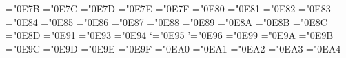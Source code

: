 \mathchardef\EmptyDownTriangle ="0E7B
\let\mEmptyDownTriangle=\EmptyDownTriangle 
\mathchardef\FilledDownTriangle ="0E7C
\let\mFilledDownTriangle=\FilledDownTriangle 
\mathchardef\FilledLeftTriangle ="0E7D
\let\mFilledLeftTriangle=\FilledLeftTriangle 
\mathchardef\star ="0E7E
\let\mFivePointedStar=\star 
\mathchardef\SixPointedStar ="0E7F
\let\mSixPointedStar=\SixPointedStar 
\mathchardef\GraySquare ="0E80
\let\mGraySquare=\GraySquare 
\mathchardef\GrayCircle ="0E81
\let\mGrayCircle=\GrayCircle 
\mathchardef\WatchIcon ="0E82
\let\mWatchIcon=\WatchIcon 
\mathchardef\KernelIcon ="0E83
\let\mKernelIcon=\KernelIcon 
\mathchardef\MathematicaIcon ="0E84
\let\mMathematicaIcon=\MathematicaIcon 
\mathchardef\flat ="0E85
\let\mFlat=\flat 
\mathchardef\natural ="0E86
\let\mNatural=\natural 
\mathchardef\sharp ="0E87
\let\mSharp=\sharp 
\mathchardef\spadesuit ="0E88
\let\mSpadeSuit=\spadesuit 
\mathchardef\heartsuit ="0E89
\let\mHeartSuit=\heartsuit 
\mathchardef\diamondsuit ="0E8A
\let\mDiamondSuit=\diamondsuit 
\mathchardef\clubsuit ="0E8B
\let\mClubSuit=\clubsuit 
\mathchardef\InvisibleSpace ="0E8C
\let\mInvisibleSpace=\InvisibleSpace 
\mathchardef\VeryThinSpace ="0E8D
\let\mVeryThinSpace=\VeryThinSpace 
\def\mThinSpace{\@unicode{ThinSpace}}
\def\mMediumSpace{\@unicode{MediumSpace}}
\def\mThickSpace{\@unicode{ThickSpace}}
\mathchardef\NegativeVeryThinSpace ="0E91
\let\mNegativeVeryThinSpace=\NegativeVeryThinSpace 
\def\mNegativeThinSpace{\@unicode{NegativeThinSpace}}
\mathchardef\negmedspace ="0E93
\let\mNegativeMediumSpace=\negmedspace 
\mathchardef\negthickspace ="0E94
\let\mNegativeThickSpace=\negthickspace 
\mathchardef\lq ="0E95
\let\mOpenCurlyQuote=\lq 
\mathchardef\rq ="0E96
\let\mCloseCurlyQuote=\rq 
\def\mOpenCurlyDoubleQuote{\@unicode{OpenCurlyDoubleQuote}}
\def\mCloseCurlyDoubleQuote{\@unicode{CloseCurlyDoubleQuote}}
\mathchardef\OverParenthesis ="0E99
\let\mOverParenthesis=\OverParenthesis 
\mathchardef\UnderParenthesis ="0E9A
\let\mUnderParenthesis=\UnderParenthesis 
\mathchardef\overbrace ="0E9B
\let\mOverBrace=\overbrace 
\mathchardef\underbrace ="0E9C
\let\mUnderBrace=\underbrace 
\mathchardef\OverBracket ="0E9D
\let\mOverBracket=\OverBracket 
\mathchardef\UnderBracket ="0E9E
\let\mUnderBracket=\UnderBracket 
\mathchardef\Null ="0E9F
\let\mNull=\Null 
\mathchardef\IndentingNewLine ="0EA0
\let\mIndentingNewLine=\IndentingNewLine 
\mathchardef\NoBreak ="0EA1
\let\mNoBreak=\NoBreak 
\mathchardef\NonBreakingSpace ="0EA2
\let\mNonBreakingSpace=\NonBreakingSpace 
\mathchardef\Continuation ="0EA3
\let\mContinuation=\Continuation 
\mathchardef\SpaceIndicator ="0EA4
